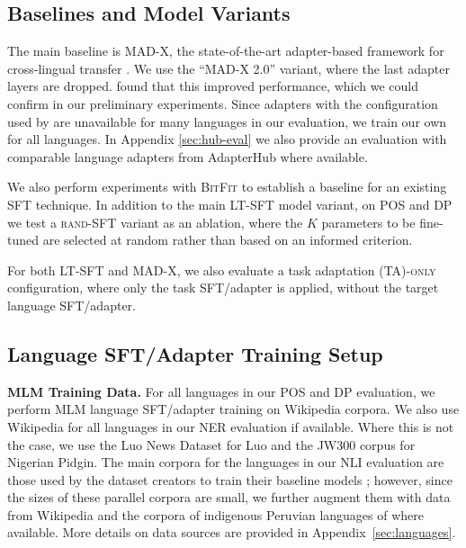 \subsection{Baselines and Model Variants}

The main baseline is {\textsc{MAD-X}}, the state-of-the-art adapter-based framework for cross-lingual transfer \citep{pfeiffer-etal-2020-mad}. We use the ``MAD-X 2.0'' variant, where the last adapter layers are dropped. \citet{pfeiffer-etal-2021-unks} found that this improved performance, which we could confirm in our preliminary experiments. Since adapters with the configuration used by \citet{pfeiffer-etal-2020-mad} are unavailable for many languages in our evaluation, we train our own for all languages. In Appendix \ref{sec:hub-eval} we also provide an evaluation with comparable language adapters from AdapterHub \citep{pfeiffer-etal-2020-adapterhub} where available.

We also perform experiments with {\textsc{BitFit}} \citep{zaken-etal-2021-bitfit} to establish a baseline for an existing SFT technique. In addition to the main {\textsc{LT-SFT}} model variant, on POS and DP we test a {\textsc{rand-SFT}} variant as an ablation, where the $K$ parameters to be fine-tuned are selected at random rather than based on an informed criterion.

For both LT-SFT and MAD-X, we also evaluate a task adaptation {\textsc{(TA)-only}} configuration, where only the task SFT/adapter is applied, without the target language SFT/adapter.

\subsection{Language SFT/Adapter Training Setup}
 \textbf{MLM Training Data.} For all languages in our POS and DP evaluation, we perform MLM language SFT/adapter training on Wikipedia corpora. We also use Wikipedia for all languages in our NER evaluation if available. Where this is not the case, we use the Luo News Dataset \citep{adelani-etal-2021-masakhaner} for Luo and the JW300 corpus \citep{agic-vulic-2019-jw300} for Nigerian Pidgin. The main corpora for the languages in our NLI evaluation are those used by the dataset creators to train their baseline models \citep{ebrahimi-etal-2021-americasnli}; however, since the sizes of these parallel corpora are small, we further augment them with data from Wikipedia and the corpora of indigenous Peruvian languages of \citet{bustamante-etal-2020-data} where available. More details on data sources are provided in Appendix~\ref{sec:languages}.

